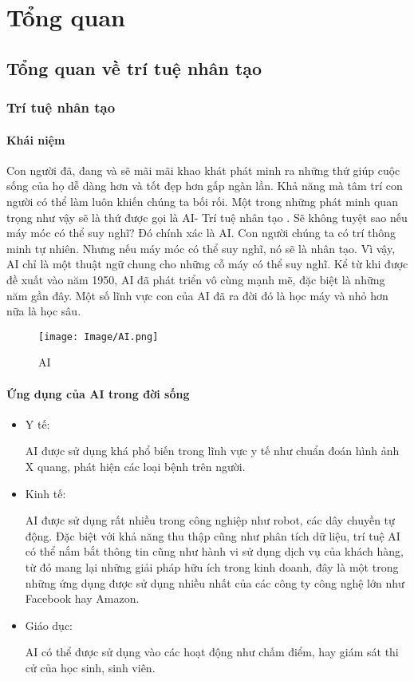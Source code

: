\chapter{Tổng quan}
\label{Chapter1}

\section{Tổng quan về trí tuệ nhân tạo}
\subsection{Trí tuệ nhân tạo}
\subsubsection*{Khái niệm}
Con người đã, đang và sẽ mãi mãi khao khát phát minh ra những thứ giúp cuộc sống của họ dễ dàng hơn và tốt đẹp hơn gấp ngàn lần. 
Khả năng mà tâm trí con người có thể làm luôn khiến chúng ta bối rối. Một trong những phát minh quan trọng như vậy sẽ là thứ được gọi 
là AI- Trí tuệ nhân tạo . Sẽ không tuyệt sao nếu máy móc có thể suy nghĩ? Đó chính xác là AI. Con người chúng ta có trí thông minh tự nhiên. 
Nhưng nếu máy móc có thể suy nghĩ, nó sẽ là nhân tạo. Vì vậy, AI chỉ là một thuật ngữ chung cho những cỗ máy có thể suy nghĩ. Kể từ khi được 
đề xuất vào năm 1950, AI đã phát triển vô cùng mạnh mẽ, đặc biệt là những năm gần đây. Một số lĩnh vực con của AI đã ra đời đó là học máy và nhỏ
hơn nữa là học sâu. 

\begin{figure}[h]
\centering
\texttt{[image: Image/AI.png]}
\caption{AI}
\label{Hình 1.1: AI}
\end{figure}

\subsubsection*{Ứng dụng của AI trong đời sống}
\begin{itemize}
    \item Y tế:
    
        AI được sử dụng khá phổ biến trong lĩnh vực y tế như chuẩn đoán hình ảnh X quang, phát hiện các loại bệnh trên người.
    
    \item Kinh tế:
    
        AI được sử dụng rất nhiều trong công nghiệp như robot, các dây chuyền tự động. Đặc biệt với khả năng thu thập cũng như phân tích dữ liệu, trí tuệ AI có thể
        nắm bắt thông tin cũng như hành vi sử dụng dịch vụ của khách hàng, từ đó mang lại những giải pháp hữu ích trong kinh doanh, đây là một trong những ứng dụng được sử
        dụng nhiều nhất của các công ty công nghệ lớn như Facebook hay Amazon.
    \item Giáo dục:
    
        AI có thể được sử dụng vào các hoạt động như chấm điểm, hay giám sát thi cử của học sinh, sinh viên.

\end{itemize}


